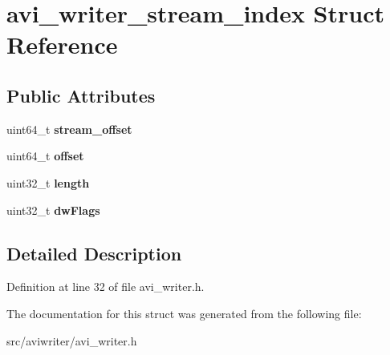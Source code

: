 \hypertarget{structavi__writer__stream__index}{\section{avi\-\_\-writer\-\_\-stream\-\_\-index Struct Reference}
\label{structavi__writer__stream__index}
}
\subsection*{Public Attributes}
\begin{DoxyCompactItemize}
\item 
\hypertarget{structavi__writer__stream__index_a1c8b47e3bf026a2354d09a2c1ab6b76e}{uint64\-\_\-t {\bfseries stream\-\_\-offset}}\label{structavi__writer__stream__index_a1c8b47e3bf026a2354d09a2c1ab6b76e}

\item 
\hypertarget{structavi__writer__stream__index_abd702cfd30345692d1216b135bc8f0dd}{uint64\-\_\-t {\bfseries offset}}\label{structavi__writer__stream__index_abd702cfd30345692d1216b135bc8f0dd}

\item 
\hypertarget{structavi__writer__stream__index_ac7814b7351c96b888ccad5eb5f1b6858}{uint32\-\_\-t {\bfseries length}}\label{structavi__writer__stream__index_ac7814b7351c96b888ccad5eb5f1b6858}

\item 
\hypertarget{structavi__writer__stream__index_aee37c3956ae6bf797f45d39beaaafa76}{uint32\-\_\-t {\bfseries dw\-Flags}}\label{structavi__writer__stream__index_aee37c3956ae6bf797f45d39beaaafa76}

\end{DoxyCompactItemize}


\subsection{Detailed Description}


Definition at line 32 of file avi\-\_\-writer.\-h.



The documentation for this struct was generated from the following file\-:\begin{DoxyCompactItemize}
\item 
src/aviwriter/avi\-\_\-writer.\-h\end{DoxyCompactItemize}
